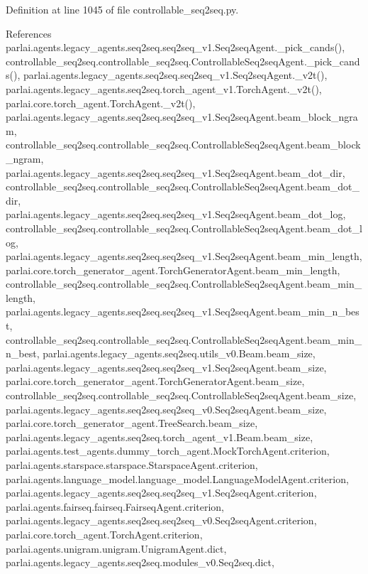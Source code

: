 Definition at line 1045 of file controllable\+\_\+seq2seq.\+py.



References parlai.\+agents.\+legacy\+\_\+agents.\+seq2seq.\+seq2seq\+\_\+v1.\+Seq2seq\+Agent.\+\_\+pick\+\_\+cands(), controllable\+\_\+seq2seq.\+controllable\+\_\+seq2seq.\+Controllable\+Seq2seq\+Agent.\+\_\+pick\+\_\+cands(), parlai.\+agents.\+legacy\+\_\+agents.\+seq2seq.\+seq2seq\+\_\+v1.\+Seq2seq\+Agent.\+\_\+v2t(), parlai.\+agents.\+legacy\+\_\+agents.\+seq2seq.\+torch\+\_\+agent\+\_\+v1.\+Torch\+Agent.\+\_\+v2t(), parlai.\+core.\+torch\+\_\+agent.\+Torch\+Agent.\+\_\+v2t(), parlai.\+agents.\+legacy\+\_\+agents.\+seq2seq.\+seq2seq\+\_\+v1.\+Seq2seq\+Agent.\+beam\+\_\+block\+\_\+ngram, controllable\+\_\+seq2seq.\+controllable\+\_\+seq2seq.\+Controllable\+Seq2seq\+Agent.\+beam\+\_\+block\+\_\+ngram, parlai.\+agents.\+legacy\+\_\+agents.\+seq2seq.\+seq2seq\+\_\+v1.\+Seq2seq\+Agent.\+beam\+\_\+dot\+\_\+dir, controllable\+\_\+seq2seq.\+controllable\+\_\+seq2seq.\+Controllable\+Seq2seq\+Agent.\+beam\+\_\+dot\+\_\+dir, parlai.\+agents.\+legacy\+\_\+agents.\+seq2seq.\+seq2seq\+\_\+v1.\+Seq2seq\+Agent.\+beam\+\_\+dot\+\_\+log, controllable\+\_\+seq2seq.\+controllable\+\_\+seq2seq.\+Controllable\+Seq2seq\+Agent.\+beam\+\_\+dot\+\_\+log, parlai.\+agents.\+legacy\+\_\+agents.\+seq2seq.\+seq2seq\+\_\+v1.\+Seq2seq\+Agent.\+beam\+\_\+min\+\_\+length, parlai.\+core.\+torch\+\_\+generator\+\_\+agent.\+Torch\+Generator\+Agent.\+beam\+\_\+min\+\_\+length, controllable\+\_\+seq2seq.\+controllable\+\_\+seq2seq.\+Controllable\+Seq2seq\+Agent.\+beam\+\_\+min\+\_\+length, parlai.\+agents.\+legacy\+\_\+agents.\+seq2seq.\+seq2seq\+\_\+v1.\+Seq2seq\+Agent.\+beam\+\_\+min\+\_\+n\+\_\+best, controllable\+\_\+seq2seq.\+controllable\+\_\+seq2seq.\+Controllable\+Seq2seq\+Agent.\+beam\+\_\+min\+\_\+n\+\_\+best, parlai.\+agents.\+legacy\+\_\+agents.\+seq2seq.\+utils\+\_\+v0.\+Beam.\+beam\+\_\+size, parlai.\+agents.\+legacy\+\_\+agents.\+seq2seq.\+seq2seq\+\_\+v1.\+Seq2seq\+Agent.\+beam\+\_\+size, parlai.\+core.\+torch\+\_\+generator\+\_\+agent.\+Torch\+Generator\+Agent.\+beam\+\_\+size, controllable\+\_\+seq2seq.\+controllable\+\_\+seq2seq.\+Controllable\+Seq2seq\+Agent.\+beam\+\_\+size, parlai.\+agents.\+legacy\+\_\+agents.\+seq2seq.\+seq2seq\+\_\+v0.\+Seq2seq\+Agent.\+beam\+\_\+size, parlai.\+core.\+torch\+\_\+generator\+\_\+agent.\+Tree\+Search.\+beam\+\_\+size, parlai.\+agents.\+legacy\+\_\+agents.\+seq2seq.\+torch\+\_\+agent\+\_\+v1.\+Beam.\+beam\+\_\+size, parlai.\+agents.\+test\+\_\+agents.\+dummy\+\_\+torch\+\_\+agent.\+Mock\+Torch\+Agent.\+criterion, parlai.\+agents.\+starspace.\+starspace.\+Starspace\+Agent.\+criterion, parlai.\+agents.\+language\+\_\+model.\+language\+\_\+model.\+Language\+Model\+Agent.\+criterion, parlai.\+agents.\+legacy\+\_\+agents.\+seq2seq.\+seq2seq\+\_\+v1.\+Seq2seq\+Agent.\+criterion, parlai.\+agents.\+fairseq.\+fairseq.\+Fairseq\+Agent.\+criterion, parlai.\+agents.\+legacy\+\_\+agents.\+seq2seq.\+seq2seq\+\_\+v0.\+Seq2seq\+Agent.\+criterion, parlai.\+core.\+torch\+\_\+agent.\+Torch\+Agent.\+criterion, parlai.\+agents.\+unigram.\+unigram.\+Unigram\+Agent.\+dict, parlai.\+agents.\+legacy\+\_\+agents.\+seq2seq.\+modules\+\_\+v0.\+Seq2seq.\+dict, 